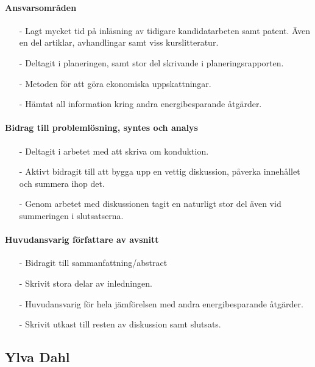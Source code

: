\documentclass[12pt,a4paper]{article}
\begin{document}
\paragraph{Ansvarsområden}

\begin{itemize}
\item[-] Lagt mycket tid på inläsning av tidigare kandidatarbeten samt patent. Även en del artiklar, avhandlingar samt viss kurslitteratur. 
\item[-] Deltagit i planeringen, samt stor del skrivande i planeringsrapporten.
\item[-] Metoden för att göra ekonomiska uppskattningar.
\item[-] Hämtat all information kring andra energibesparande åtgärder. 
\end{itemize}


\paragraph{Bidrag till problemlösning, syntes och analys}

\begin{itemize}
\item[-] Deltagit i arbetet med att skriva om konduktion.
\item[-] Aktivt bidragit till att bygga upp en vettig diskussion, påverka innehållet och summera ihop det.
\item[-] Genom arbetet med diskussionen tagit en naturligt stor del även vid summeringen i slutsatserna.
\end{itemize}


\paragraph{Huvudansvarig författare av avsnitt}

\begin{itemize}
\item[-] Bidragit till sammanfattning/abstract
\item[-] Skrivit stora delar av inledningen.
\item[-] Huvudansvarig för hela jämförelsen med andra energibesparande åtgärder.
\item[-] Skrivit utkast till resten av diskussion samt slutsats.
\end{itemize}




\subsection*{Ylva Dahl}
\end{document}
